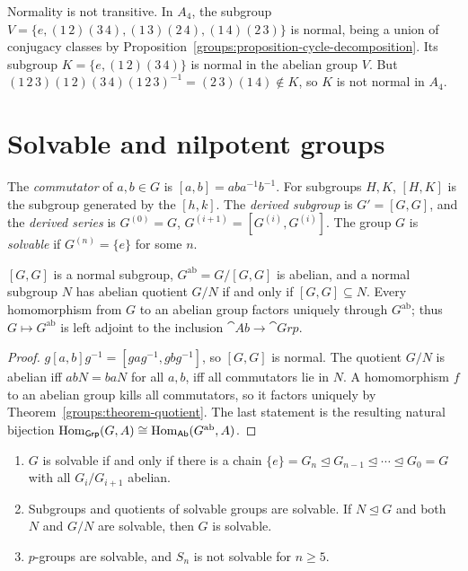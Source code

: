 \begin{counterexample}\label{groups:counterexample-normal-not-transitive}
Normality is not transitive. In $A_4$, the subgroup
$V = \{e, (1\,2)(3\,4), (1\,3)(2\,4), (1\,4)(2\,3)\}$ is normal, being a union of
conjugacy classes by Proposition~\ref{groups:proposition-cycle-decomposition}. Its
subgroup $K = \{e, (1\,2)(3\,4)\}$ is normal in the abelian group $V$. But
$(1\,2\,3)(1\,2)(3\,4)(1\,2\,3)^{-1} = (2\,3)(1\,4) \notin K$, so $K$ is not normal in $A_4$.
\end{counterexample}

\section{Solvable and nilpotent groups}\label{groups:section-solvable}

\begin{definition}\label{groups:definition-commutator}
The \emph{commutator} of $a, b \in G$ is $[a, b] = aba^{-1}b^{-1}$. For subgroups
$H, K$, $[H, K]$ is the subgroup generated by the $[h, k]$. The \emph{derived
subgroup} is $G' = [G, G]$, and the \emph{derived series} is $G^{(0)} = G$,
$G^{(i+1)} = [G^{(i)}, G^{(i)}]$. The group $G$ is \emph{solvable} if
$G^{(n)} = \{e\}$ for some $n$.
\end{definition}

\begin{proposition}\label{groups:proposition-abelianization}
$[G, G]$ is a normal subgroup, $G^{\mathrm{ab}} = G/[G, G]$ is abelian, and a normal
subgroup $N$ has abelian quotient $G/N$ if and only if $[G, G] \subseteq N$. Every
homomorphism from $G$ to an abelian group factors uniquely through $G^{\mathrm{ab}}$;
thus $G \mapsto G^{\mathrm{ab}}$ is left adjoint to the inclusion $\cat{Ab} \to \cat{Grp}$.
\end{proposition}

\begin{proof}
$g[a, b]g^{-1} = [gag^{-1}, gbg^{-1}]$, so $[G, G]$ is normal. The quotient $G/N$ is
abelian iff $abN = baN$ for all $a, b$, iff all commutators lie in $N$. A
homomorphism $f$ to an abelian group kills all commutators, so it factors
uniquely by Theorem~\ref{groups:theorem-quotient}. The last statement is the
resulting natural bijection $\operatorname{Hom}_{\mathsf{Grp}}(G, A) \cong \operatorname{Hom}_{\mathsf{Ab}}(G^{\mathrm{ab}}, A)$.
\end{proof}

\begin{proposition}\label{groups:proposition-solvable}
\begin{enumerate}
\item $G$ is solvable if and only if there is a chain
$\{e\} = G_n \trianglelefteq G_{n-1} \trianglelefteq \cdots \trianglelefteq G_0 = G$ with all $G_{i}/G_{i+1}$ abelian.
\item Subgroups and quotients of solvable groups are solvable. If
$N \trianglelefteq G$ and both $N$ and $G/N$ are solvable, then $G$ is solvable.
\item $p$-groups are solvable, and $S_n$ is not solvable for $n \geq 5$.
\end{enumerate}
\end{proposition}

